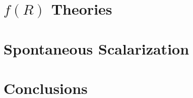 \documentclass[a4paper,12pt,oneside,customfont,custombib,PageStyleII]{Settings/PhDThesisPSnPDF}
\begin{document}
\chapter{\texorpdfstring{$f(R)$}{f(R)} Theories}\label{chap:chapter2}




\chapter{Spontaneous Scalarization}\label{chap:SS}




\chapter*{Conclusions}\label{chap:conclusions}

\begin{appendices} %
\chapter{}\label{appendixA}

\end{appendices} 

\backmatter

\begin{spacing}{0.9}

\cleardoublepage
\nocite{*}
\printbibliography[heading=bibintoc, title={References}]
\thispagestyle{empty}
\end{spacing}

\end{document}

